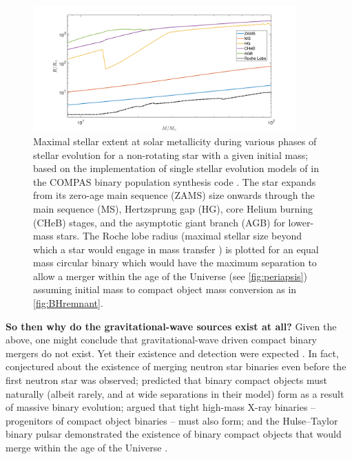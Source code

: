 \documentclass[iop,onecolumn]{revtex4}
\begin{document}
\begin{figure}
	\centering	
	\includegraphics[width=0.9\textwidth]{StellarRadiusZsolarRoche.png}
\caption{Maximal stellar extent at solar metallicity during various phases of stellar evolution for a non-rotating star with a given initial mass; based on the implementation of single stellar evolution models of \citet{Hurley:2000} in the COMPAS binary population synthesis code \citep{Stevenson:2017}.   The star expands from its zero-age main sequence (ZAMS) size onwards through the main sequence (MS), Hertzsprung gap (HG), core Helium burning (CHeB) stages, and the asymptotic giant branch (AGB) for lower-mass stars.  The Roche lobe radius (maximal stellar size beyond which a star would engage in mass transfer \citep{Eggleton:1983}) is plotted for an equal mass circular binary which would have the maximum separation to allow a merger within the age of the Universe (see \autoref{fig:periapsis}) assuming initial mass to compact object mass conversion as in \autoref{fig:BHremnant}.\label{fig:Rmax} }
\end{figure}

\textbf{So then why do the gravitational-wave sources exist at all?} Given the above, one might conclude that gravitational-wave driven compact binary mergers do not exist. Yet their existence and detection were expected \citep{ratesdoc}. In fact, \citet{Dyson:1962} conjectured about the existence of merging neutron star binaries even before the first neutron star was observed; \citet{Tutukov:1973} predicted that binary compact objects must naturally (albeit rarely, and at wide separations in their model) form as a result of massive binary evolution; \citet{vdHDeLoore:1973} argued that tight high-mass X-ray binaries -- progenitors of compact object binaries -- must also form; and the Hulse--Taylor binary pulsar \citep{HulseTaylor:1975} demonstrated the existence of binary compact objects that would merge within the age of the Universe \citep[for early explanations of its formation in the context of binary evolution, see][]{FlanneryvdH:1975,DeLoore:1975}.
\end{document}
